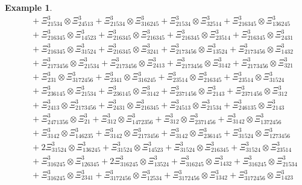 \documentclass{amsart}
\theoremstyle{definition}
\newtheorem{example}[lemma]{Example}
\theoremstyle{remark}
\numberwithin{equation}{subsection}
\begin{document}
\begin{example}
\begin{align*}
&\quad + \Xi_{21534}^{3} \otimes \Xi_{24513}^{3} + \Xi_{21534}^{3} \otimes \Xi_{316245}^{3} + \Xi_{21534}^{3} \otimes \Xi_{32514}^{3} + \Xi_{216345}^{3} \otimes \Xi_{136245}^{3} \\
&\quad + \Xi_{216345}^{3} \otimes \Xi_{14523}^{3} + \Xi_{216345}^{3} \otimes \Xi_{216345}^{3} + \Xi_{216345}^{3} \otimes \Xi_{23514}^{3} + \Xi_{216345}^{3} \otimes \Xi_{2431}^{3} \\
&\quad + \Xi_{216345}^{3} \otimes \Xi_{31524}^{3} + \Xi_{216345}^{3} \otimes \Xi_{3241}^{3} + \Xi_{2173456}^{3} \otimes \Xi_{13524}^{3} + \Xi_{2173456}^{3} \otimes \Xi_{1432}^{3} \\
&\quad + \Xi_{2173456}^{3} \otimes \Xi_{21534}^{3} + \Xi_{2173456}^{3} \otimes \Xi_{2413}^{3} + \Xi_{2173456}^{3} \otimes \Xi_{3142}^{3} + \Xi_{2173456}^{3} \otimes \Xi_{321}^{3} \\
&\quad + \Xi_{231}^{3} \otimes \Xi_{3172456}^{3} + \Xi_{2341}^{3} \otimes \Xi_{316245}^{3} + \Xi_{23514}^{3} \otimes \Xi_{216345}^{3} + \Xi_{23514}^{3} \otimes \Xi_{31524}^{3} \\
&\quad + \Xi_{236145}^{3} \otimes \Xi_{21534}^{3} + \Xi_{236145}^{3} \otimes \Xi_{3142}^{3} + \Xi_{2371456}^{3} \otimes \Xi_{2143}^{3} + \Xi_{2371456}^{3} \otimes \Xi_{312}^{3} \\
&\quad + \Xi_{2413}^{3} \otimes \Xi_{2173456}^{3} + \Xi_{2431}^{3} \otimes \Xi_{216345}^{3} + \Xi_{24513}^{3} \otimes \Xi_{21534}^{3} + \Xi_{246135}^{3} \otimes \Xi_{2143}^{3} \\
&\quad + \Xi_{2471356}^{3} \otimes \Xi_{21}^{3} + \Xi_{312}^{3} \otimes \Xi_{1472356}^{3} + \Xi_{312}^{3} \otimes \Xi_{2371456}^{3} + \Xi_{3142}^{3} \otimes \Xi_{1372456}^{3} \\
&\quad + \Xi_{3142}^{3} \otimes \Xi_{146235}^{3} + \Xi_{3142}^{3} \otimes \Xi_{2173456}^{3} + \Xi_{3142}^{3} \otimes \Xi_{236145}^{3} + \Xi_{31524}^{3} \otimes \Xi_{1273456}^{3} \\
&\quad + 2 \Xi_{31524}^{3} \otimes \Xi_{136245}^{3} + \Xi_{31524}^{3} \otimes \Xi_{14523}^{3} + \Xi_{31524}^{3} \otimes \Xi_{216345}^{3} + \Xi_{31524}^{3} \otimes \Xi_{23514}^{3} \\
&\quad + \Xi_{316245}^{3} \otimes \Xi_{126345}^{3} + 2 \Xi_{316245}^{3} \otimes \Xi_{13524}^{3} + \Xi_{316245}^{3} \otimes \Xi_{1432}^{3} + \Xi_{316245}^{3} \otimes \Xi_{21534}^{3} \\
&\quad + \Xi_{316245}^{3} \otimes \Xi_{2341}^{3} + \Xi_{3172456}^{3} \otimes \Xi_{12534}^{3} + \Xi_{3172456}^{3} \otimes \Xi_{1342}^{3} + \Xi_{3172456}^{3} \otimes \Xi_{1423}^{3} \\

\end{align*}
\end{example}
\end{document}
